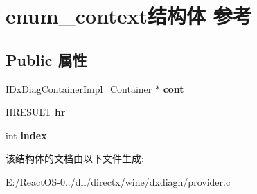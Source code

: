 \hypertarget{structenum__context}{}\section{enum\+\_\+context结构体 参考}
\label{structenum__context}
\subsection*{Public 属性}
\begin{DoxyCompactItemize}
\item 
\mbox{\label{structenum__context_a2bd148199a96e44f0433ef719a4d021a}} 
\hyperlink{struct_i_dx_diag_container_impl___container}{I\+Dx\+Diag\+Container\+Impl\+\_\+\+Container} $\ast$ {\bfseries cont}
\item 
\mbox{\label{structenum__context_afa407e0095aaac5986efe07ad12fb3d5}} 
H\+R\+E\+S\+U\+LT {\bfseries hr}
\item 
\mbox{\label{structenum__context_a3e8d8d11797b20d34178c8caba6cc7f9}} 
int {\bfseries index}
\end{DoxyCompactItemize}


该结构体的文档由以下文件生成\+:\begin{DoxyCompactItemize}
\item 
E\+:/\+React\+O\+S-\/0../dll/directx/wine/dxdiagn/provider.\+c\end{DoxyCompactItemize}
